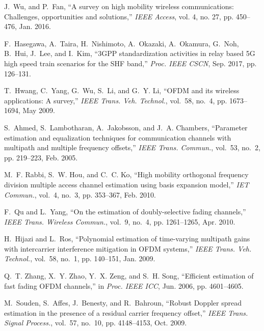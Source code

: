 \documentclass[12pt, draftclsnofoot, onecolumn]{IEEEtran}
\begin{document}
\linespread{1.24}
\begin{thebibliography}{99}

J.~Wu, and P.~Fan, ``A survey on high mobility wireless communications: Challenges, opportunities and solutions,'' \emph{IEEE Access}, vol. 4, no. 27, pp. 450--476, Jan. 2016.

F.~Hasegawa, A.~Taira, H.~Nishimoto, A.~Okazaki, A.~Okamura, G.~Noh, B.~Hui, J.~Lee, and I.~Kim, ``3GPP standardization activities in relay based 5G high speed train scenarios for the SHF band,'' \emph{Proc. IEEE CSCN}, Sep. 2017, pp. 126--131.

T.~Hwang, C.~Yang, G.~Wu, S.~Li, and G.~Y. Li, ``OFDM and its wireless
applications: A survey,'' \emph{IEEE Trans. Veh. Technol.}, vol.~58, no.~4, pp. 1673--1694, May 2009.
%

S.~Ahmed, S.~Lambotharan, A.~Jakobsson, and J.~A. Chambers, ``Parameter
estimation and equalization techniques for communication channels with multipath and multiple frequency offsets,'' \emph{IEEE Trans. Commun.},
vol.~53, no.~2, pp. 219--223, Feb. 2005.

M.~F. Rabbi, S.~W. Hou, and C.~C. Ko, ``High mobility orthogonal frequency
division multiple access channel estimation using basis expansion model,''
\emph{IET Commun.}, vol.~4, no.~3, pp. 353--367, Feb. 2010.

F.~Qu and L.~Yang, ``On the estimation of doubly-selective fading channels,'' \emph{IEEE Trans. Wireless Commun.}, vol.~9, no.~4, pp. 1261--1265, Apr. 2010.

H.~Hijazi and L.~Ros, ``Polynomial estimation of time-varying multipath gains with intercarrier interference mitigation in OFDM systems,'' \emph{IEEE Trans. Veh. Technol.}, vol.~58, no.~1, pp. 140--151, Jan. 2009.

Q.~T. Zhang, X.~Y. Zhao, Y.~X. Zeng, and S.~H. Song, ``Efficient estimation of fast fading OFDM channels,'' in \emph{Proc. IEEE ICC}, Jun. 2006, pp. 4601--4605.

M.~Souden, S.~Affes, J.~Benesty, and R.~Bahroun, ``Robust Doppler spread estimation in the presence of a residual carrier frequency offset,'' \emph{IEEE Trans. Signal Process.}, vol.~57, no.~10, pp. 4148--4153, Oct. 2009.


\end{thebibliography}
\end{document}

